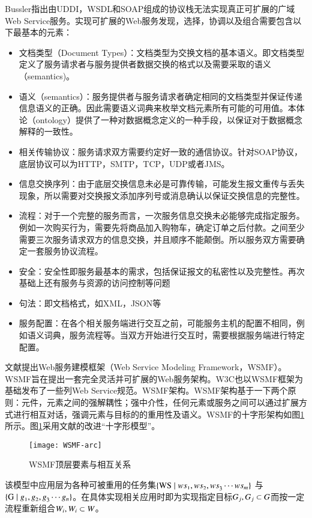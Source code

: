 Bussler\cite{fensel2002web}指出由UDDI，WSDL和SOAP组成的协议栈无法实现真正可扩展的广域Web Service服务。实现可扩展的Web服务发现，选择，协调以及组合需要包含以下最基本的元素\cite{bussler2001b2b}：
\begin{itemize}
\item 文档类型（Document Types）：文档类型为交换文档的基本语义。即文档类型定义了服务请求者与服务提供者数据交换的格式以及需要采取的语义（semantics)。
\item 语义（semantics）：服务提供者与服务请求者确定相同的文档类型并保证传递信息语义的正确。因此需要语义词典来枚举文档元素所有可能的可用值。本体论（ontology）提供了一种对数据概念定义的一种手段，以保证对于数据概念解释的一致性。
\item 相关传输协议：服务请求双方需要约定好一致的通信协议。针对SOAP协议，底层协议可以为HTTP，SMTP，TCP，UDP或者JMS。
\item 信息交换序列：由于底层交换信息未必是可靠传输，可能发生报文重传与丢失现象，所以需要对交换报文添加序列号或消息确认以保证交换信息的完整性。
\item 流程：对于一个完整的服务而言，一次服务信息交换未必能够完成指定服务。例如一次购买行为，需要先将商品加入购物车，确定订单之后付款。之间至少需要三次服务请求双方的信息交换，并且顺序不能颠倒。所以服务双方需要确定一套服务协议流程。
\item 安全：安全性即服务最基本的需求，包括保证报文的私密性以及完整性。再次基础上还有服务与资源的访问控制等问题
\item 句法：即文档格式，如XML，JSON等
\item 服务配置：在各个相关服务端进行交互之前，可能服务主机的配置不相同，例如语义词典，服务流程等。当双方开始进行交互时，需要根据服务端进行特定配置。
\end{itemize}

文献\cite{fensel2002web}提出Web服务建模框架（Web Service Modeling Framework，WSMF）。WSMF旨在提出一套完全灵活并可扩展的Web服务架构。W3C也以WSMF框架为基础发布了一些列Web Service规范。\cite{WSMF-imp}WSMF架构。WSMF架构基于一下两个原则：元件，元素之间的强解耦性；强中介性，任何元素或服务之间可以通过扩展方式进行相互对话，强调元素与目标的的重用性及语义。WSMF的十字形架构如图\ref{fig:WSMF-arc}所示。图\ref{fig:WSMF-arc}采用文献\cite{WSMF-imp}的改进“十字形模型”。

\begin{figure}[H]
  \centering
  \texttt{[image: WSMF-arc]}
  \caption{WSMF顶层要素与相互关系}
  \label{fig:WSMF-arc}
\end{figure}

该模型中应用层为各种可被重用的任务集$\{\mathrm{WS}\mid\mathnormal{ws_{1}}, \mathnormal{ws_{2}}, \mathnormal{ws_{3}} \cdots \mathnormal{ws_{m}}\}$ 与$ \{\mathrm{G}\mid\mathnormal{g_{1}}, \mathnormal{g_{2}}, \mathnormal{g_{3}} \cdots \mathnormal{g_{n}}\}$。在具体实现相关应用时即为实现指定目标$\mathnormal{G_j}, \mathnormal{G_j}\subset\mathnormal{G}$而按一定流程重新组合$\mathnormal{W_i}, \mathnormal{W_i}\subset\mathnormal{W}$。

